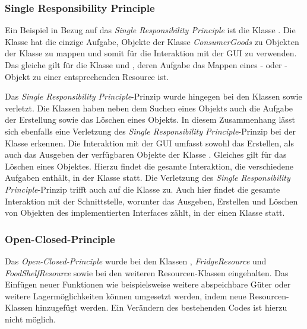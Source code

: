 \subsubsection*{Single Responsibility Principle}
Ein Beispiel in Bezug auf das \textit{Single Responsibility Principle} ist die Klasse .
Die Klasse hat die einzige Aufgabe, Objekte der Klasse \href{}{\code{}}\textit{ConsumerGoods} zu Objekten der Klasse \href{}{\code{}} zu mappen und somit für die Interaktion mit der \ac{GUI} zu verwenden.
Das gleiche gilt für die Klasse \href{}{\code{}} und \href{}{\code{}}, deren Aufgabe das Mappen eines \href{}{\code{}}- oder \href{}{\code{}}-Objekt zu einer entsprechenden Resource ist.

Das \textit{Single Responsibility Principle}-Prinzip wurde hingegen bei den Klassen \href{}{\code{}} sowie \href{}{\code{}} verletzt. Die Klassen haben neben dem Suchen eines Objekts auch die Aufgabe der Erstellung sowie das Löschen eines Objekts.
In diesem Zusammenhang lässt sich ebenfalls eine Verletzung des \textit{Single Responsibility Principle}-Prinzip bei der Klasse \href{}{\code{}} erkennen.
Die Interaktion mit der \ac{GUI} umfasst sowohl das Erstellen, als auch das Ausgeben der verfügbaren Objekte der Klasse \href{}{\code{}}.
Gleiches gilt für das Löschen eines Objektes.
Hierzu findet die gesamte Interaktion, die verschiedene Aufgaben enthält, in der Klasse \href{}{\code{}} statt.
Die Verletzung des \textit{Single Responsibility Principle}-Prinzip trifft auch auf die Klasse \href{}{\code{}} zu.
Auch hier findet die gesamte Interaktion mit der Schnittstelle, worunter das Ausgeben, Erstellen und Löschen von Objekten des implementierten Interfaces \href{}{\code{}} zählt, in der einen Klasse statt.


\subsubsection*{Open-Closed-Principle}
Das \textit{Open-Closed-Principle} wurde bei den Klassen \href{}{\code{}}, \href{}{\code{}}\textit{FridgeResource} und \href{}{\code{}}\textit{FoodShelfResource} sowie bei den weiteren Resourcen-Klassen eingehalten.
Das Einfügen neuer Funktionen wie beispielsweise weitere abspeichbare Güter oder weitere Lagermöglichkeiten können umgesetzt werden, indem neue Resourcen-Klassen hinzugefügt werden.
Ein Verändern des bestehenden Codes ist hierzu nicht möglich.

